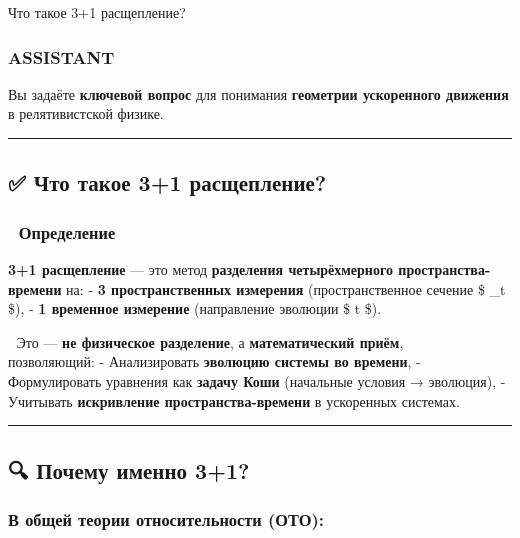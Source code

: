 \documentclass[11pt]{article}
\begin{document}
Что такое 3+1 расщепление?

\subsubsection{ASSISTANT}\label{assistant-2}

Вы задаёте \textbf{ключевой вопрос} для понимания \textbf{геометрии
ускоренного движения} в релятивистской физике.

\begin{center}\rule{0.5\linewidth}{\linethickness}\end{center}

\subsection{✅ Что такое 3+1
расщепление?}\label{ux447ux442ux43e-ux442ux430ux43aux43eux435-31-ux440ux430ux441ux449ux435ux43fux43bux435ux43dux438ux435}

\subsubsection{🔹
Определение}\label{ux43eux43fux440ux435ux434ux435ux43bux435ux43dux438ux435}

\textbf{3+1 расщепление} --- это метод \textbf{разделения четырёхмерного
пространства-времени} на: - \textbf{3 пространственных измерения}
(пространственное сечение \$ \Sigma\_t \$), - \textbf{1 временное
измерение} (направление эволюции \$ t \$).

📌 Это --- \textbf{не физическое разделение}, а \textbf{математический
приём},\\
позволяющий: - Анализировать \textbf{эволюцию системы во времени}, -
Формулировать уравнения как \textbf{задачу Коши} (начальные условия →
эволюция), - Учитывать \textbf{искривление пространства-времени} в
ускоренных системах.

\begin{center}\rule{0.5\linewidth}{\linethickness}\end{center}

\subsection{🔍 Почему именно
3+1?}\label{ux43fux43eux447ux435ux43cux443-ux438ux43cux435ux43dux43dux43e-31}

\subsubsection{В общей теории относительности
(ОТО):}\label{ux432-ux43eux431ux449ux435ux439-ux442ux435ux43eux440ux438ux438-ux43eux442ux43dux43eux441ux438ux442ux435ux43bux44cux43dux43eux441ux442ux438-ux43eux442ux43e}
\end{document}

